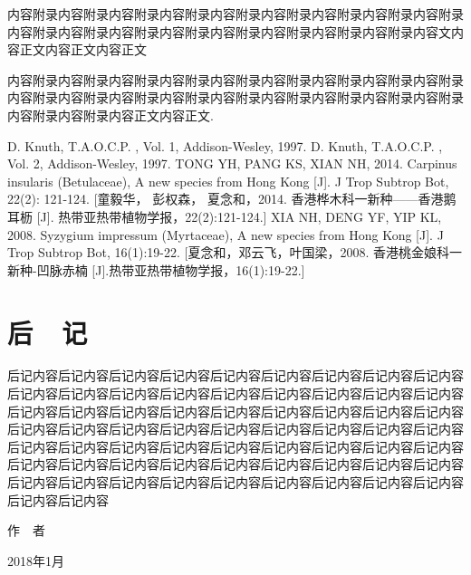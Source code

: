 \documentclass[utf8]{book}
\begin{document}
内容附录内容附录内容附录内容附录内容附录内容附录内容附录内容附录内容附录内容附录内容附录内容附录内容附录内容附录内容附录内容附录内容附录内容文内容正文内容正文内容正文

内容附录内容附录内容附录内容附录内容附录内容附录内容附录内容附录内容附录内容附录内容附录内容附录内容附录内容附录内容附录内容附录内容附录内容附录内容附录内容附录内容正文内容正文\cite{DK1}.

\renewcommand\indexname{索~~引}
\printindex
{}

\backmatter


\begin{thebibliography}{参考文献}
 D. Knuth, T.A.O.C.P. , Vol. 1, Addison-Wesley, 1997.
 D. Knuth, T.A.O.C.P. , Vol. 2, Addison-Wesley, 1997.
 TONG YH, PANG KS, XIAN NH, 2014. Carpinus insularis (Betulaceae), A new species from Hong Kong [J]. J Trop Subtrop Bot, 22(2): 121-124. [童毅华， 彭权森， 夏念和，2014. 香港桦木科一新种——香港鹅耳枥 [J]. 热带亚热带植物学报，22(2):121-124.]
 XIA NH, DENG YF, YIP KL, 2008. Syzygium impressum (Myrtaceae), A new species from Hong Kong [J]. J Trop Subtrop Bot, 16(1):19-22. [夏念和，邓云飞，叶国梁，2008. 香港桃金娘科一新种-凹脉赤楠 [J].热带亚热带植物学报，16(1):19-22.]
\end{thebibliography}

\chapter{后~~记}

后记内容后记内容后记内容后记内容后记内容后记内容后记内容后记内容后记内容后记内容后记内容后记内容后记内容后记内容后记内容后记内容后记内容后记内容后记内容后记内容后记内容后记内容后记内容后记内容后记内容后记内容后记内容后记内容后记内容后记内容后记内容后记内容后记内容后记内容后记内容后记内容后记内容后记内容后记内容后记内容后记内容后记内容后记内容后记内容后记内容后记内容后记内容后记内容后记内容后记内容后记内容后记内容后记内容后记内容后记内容后记内容后记内容后记内容后记内容后记内容后记内容后记内容后记内容后记内容后记内容

\begin{flushright}
作~~者~~~~~~~~~

2018年1月~~~~~
\end{flushright}
\end{document}
